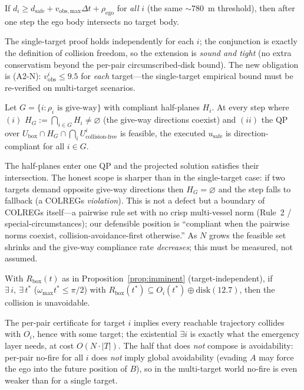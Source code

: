 \begin{proposition}
\label{prop:farfield-N}
If $d_i\ge d_{\mathrm{safe}}+v_{\mathrm{obs,max}}\Delta t+\rho_{\mathrm{ego}}$ for
\emph{all} $i$ (the same $\sim\!780$~m threshold), then after one step the ego body
intersects no target body.
\end{proposition}
The single-target proof holds independently for each $i$; the conjunction is exactly
the definition of collision freedom, so the extension is \emph{sound and tight}
(no extra conservatism beyond the per-pair circumscribed-disk bound). The new
obligation is (A2-N): $v_{\mathrm{obs}}^i\le9.5$ for \emph{each} target---the
single-target empirical bound must be re-verified on multi-target scenarios.

\begin{proposition}
\label{prop:compliance-N}
Let $G=\{i:\rho_i \text{ is give-way}\}$ with compliant half-planes $H_i$. At every
step where $(i)$ $H_G:=\bigcap_{i\in G}H_i\ne\varnothing$ (the give-way directions
coexist) and $(ii)$ the QP over $U_{\mathrm{box}}\cap H_G\cap\bigcap_i
U_{\mathrm{collision\text{-}free}}^i$ is feasible, the executed $u_{\mathrm{safe}}$ is
direction-compliant for all $i\in G$.
\end{proposition}
The half-planes enter one QP and the projected solution satisfies their
intersection. The honest scope is sharper than in the single-target case: if two
targets demand opposite give-way directions then $H_G=\varnothing$ and the step falls
to fallback (a COLREGs \emph{violation}). This is not a defect but a boundary of
COLREGs itself---a pairwise rule set with no crisp multi-vessel norm (Rule~2 /
special-circumstances); our defensible position is ``compliant when the pairwise
norms coexist, collision-avoidance-first otherwise.'' As $N$ grows the feasible set
shrinks and the give-way compliance rate \emph{decreases}; this must be measured,
not assumed.

\begin{proposition}
\label{prop:imminent-N}
With $R_{\mathrm{box}}(t)$ as in Proposition~\ref{prop:imminent} (target-independent),
if $\exists\,i,\ \exists\,t^\ast$ ($\omega_{\max}t^\ast\le\pi/2$) with
$R_{\mathrm{box}}(t^\ast)\subseteq O_i(t^\ast)\oplus\mathrm{disk}(12.7)$, then the
collision is unavoidable.
\end{proposition}
The per-pair certificate for target $i$ implies every reachable trajectory collides
with $O_i$, hence with some target; the existential $\exists i$ is exactly what the
emergency layer needs, at cost $O(N\cdot|T|)$. The half that does \emph{not} compose
is avoidability: per-pair no-fire for all $i$ does \emph{not} imply global
avoidability (evading $A$ may force the ego into the future position of $B$), so
in the multi-target world no-fire is even weaker than for a single target.

